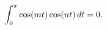 \[\int_{0}^{\pi}\mathop{\cos\/}\nolimits\!\left(mt\right)\mathop{\cos\/}%
\nolimits\!\left(nt\right)dt=0,\]